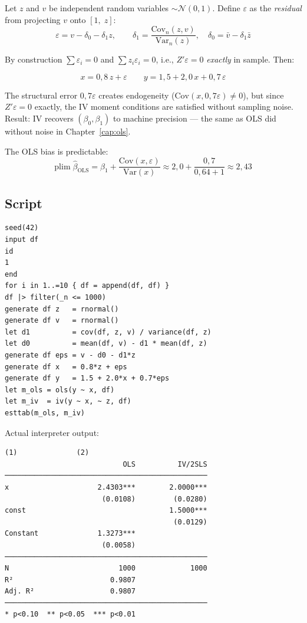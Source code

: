 Let $z$ and $v$ be independent random variables $\sim \mathcal{N}(0,1)$.
Define $\varepsilon$ as the \emph{residual} from projecting $v$ onto $[1,\;z]$:
\[
  \varepsilon = v - \delta_0 - \delta_1 z,
  \qquad
  \delta_1 = \frac{\mathrm{Cov}_n(z,v)}{\mathrm{Var}_n(z)},
  \quad
  \delta_0 = \bar v - \delta_1\bar z
\]

By construction $\sum \varepsilon_i = 0$ and $\sum z_i\varepsilon_i = 0$, i.e.,
$Z'\varepsilon = 0$ \emph{exactly} in sample. Then:

\[
  x = 0{,}8\,z + \varepsilon
  \qquad
  y = 1{,}5 + 2{,}0\,x + 0{,}7\,\varepsilon
\]

The structural error $0{,}7\varepsilon$ creates endogeneity ($\mathrm{Cov}(x,0{,}7\varepsilon) \neq 0$),
but since $Z'\varepsilon = 0$ exactly, the IV moment conditions are
satisfied without sampling noise. Result: IV recovers $(\beta_0, \beta_1)$
to machine precision --- the same as OLS did without noise in Chapter~\ref{cap:ols}.

The OLS bias is predictable:
\[
  \mathrm{plim}\;\hat\beta_{\mathrm{OLS}}
  = \beta_1 + \frac{\mathrm{Cov}(x,\varepsilon)}{\mathrm{Var}(x)}
  \approx 2{,}0 + \frac{0{,}7}{0{,}64 + 1}
  \approx 2{,}43
\]

\subsection*{Script}

\begin{lstlisting}[caption={DGP with endogeneity --- OLS vs.\ IV}]
seed(42)
input df
id
1
end
for i in 1..=10 { df = append(df, df) }
df |> filter(_n <= 1000)
generate df z   = rnormal()
generate df v   = rnormal()
let d1          = cov(df, z, v) / variance(df, z)
let d0          = mean(df, v) - d1 * mean(df, z)
generate df eps = v - d0 - d1*z
generate df x   = 0.8*z + eps
generate df y   = 1.5 + 2.0*x + 0.7*eps
let m_ols = ols(y ~ x, df)
let m_iv  = iv(y ~ x, ~ z, df)
esttab(m_ols, m_iv)
\end{lstlisting}

\noindent Actual interpreter output:

\begin{lstlisting}[language={}, basicstyle=\ttfamily\small,
  frame=none, numbers=none, backgroundcolor=\color{codbg},
  xleftmargin=0pt, xrightmargin=0pt, breaklines=false]
                            (1)              (2)
                            OLS          IV/2SLS
────────────────────────────────────────────────
x                     2.4303***        2.0000***
                       (0.0108)         (0.0280)
const                                  1.5000***
                                        (0.0129)
Constant              1.3273***
                       (0.0058)
────────────────────────────────────────────────
N                          1000             1000
R²                       0.9807
Adj. R²                  0.9807
────────────────────────────────────────────────
* p<0.10  ** p<0.05  *** p<0.01
\end{lstlisting}

